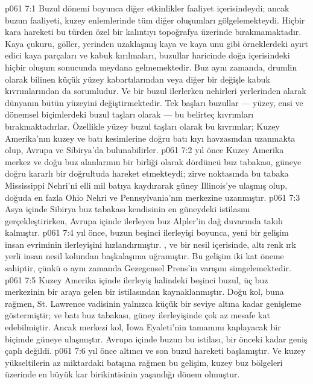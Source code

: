 \vs p061 7:1 Buzul dönemi boyunca diğer etkinlikler faaliyet içerisindeydi; ancak buzun faaliyeti, kuzey enlemlerinde tüm diğer oluşumları gölgelemekteydi. Hiçbir kara hareketi bu türden özel bir kalıntıyı topoğrafya üzerinde bırakmamaktadır. Kaya çukuru, göller, yerinden uzaklaşmış kaya ve kaya unu gibi örneklerdeki ayırt edici kaya parçaları ve kabuk kırılmaları, buzullar haricinde doğa içerisindeki hiçbir oluşum sonucunda meydana gelmemektedir. Buz aynı zamanda, drumlin olarak bilinen küçük yüzey kabartılarından veya diğer bir değişle kabuk kıvrımlarından da sorumludur. Ve bir buzul ilerlerken nehirleri yerlerinden alarak dünyanın bütün yüzeyini değiştirmektedir. Tek başları buzullar --- yüzey, ensi ve dönemsel biçimlerdeki buzul taşları olarak --- bu belirteç kıvrımları bırakmaktadırlar. Özellikle yüzey buzul taşları olarak bu kıvrımlar; Kuzey Amerika’nın kuzey ve batı kesimlerine doğru batı kıyı havzasından uzanmakta olup, Avrupa ve Sibirya’da bulunabilirler.
\vs p061 7:2  yıl önce Kuzey Amerika merkez ve doğu buz alanlarının bir birliği olarak dördüncü buz tabakası, güneye doğru kararlı bir doğrultuda hareket etmekteydi; zirve noktasında bu tabaka Mississippi Nehri’ni elli mil batıya kaydırarak güney Illinois’ye ulaşmış olup, doğuda en fazla Ohio Nehri ve Pennsylvania’nın merkezine uzanmıştır.
\vs p061 7:3 Asya içinde Sibirya buz tabakası kendisinin en güneydeki istilasını gerçekleştirirken, Avrupa içinde ilerleyen buz Alpler’in dağ duvarında takılı kalmıştır.
\vs p061 7:4  yıl önce, buzun beşinci ilerleyişi boyunca, yeni bir gelişim insan evriminin ilerleyişini hızlandırmıştır. , ve bir nesil içerisinde, altı renk ırk yerli insan nesil kolundan başkalaşıma uğramıştır. Bu gelişim iki kat öneme sahiptir, çünkü o aynı zamanda Gezegensel Prens’in varışını simgelemektedir.
\vs p061 7:5 Kuzey Amerika içinde ilerleyiş halindeki beşinci buzul, üç buz merkezinin bir araya gelen bir istilasından kaynaklanmıştır. Doğu kol, buna rağmen, St. Lawrence vadisinin yalnızca küçük bir seviye altına kadar genişleme göstermiştir; ve batı buz tabakası, güney ilerleyişinde çok az mesafe kat edebilmiştir. Ancak merkezi kol, Iowa Eyaleti’nin tamamını kaplayacak bir biçimde güneye ulaşmıştır. Avrupa içinde buzun bu istilası, bir önceki kadar geniş çaplı değildi.
\vs p061 7:6  yıl önce altıncı ve son buzul hareketi başlamıştır. Ve kuzey yükseltilerin az miktardaki batışına rağmen bu gelişim, kuzey buz bölgeleri üzerinde en büyük kar birikintisinin yaşandığı dönem olmuştur.
